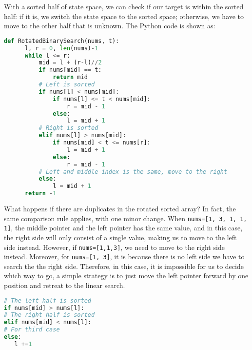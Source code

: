\documentclass[main.tex]{subfiles}
\begin{document}
With a sorted half of state space, we can check if our target is within the sorted half: if it is, we switch the state space to the sorted space; otherwise, we have to move to the other half that is unknown. The Python code is shown as:
\begin{lstlisting}[language=Python]
def RotatedBinarySearch(nums, t):   
      l, r = 0, len(nums)-1
      while l <= r:
          mid = l + (r-l)//2
          if nums[mid] == t:
              return mid
          # Left is sorted
          if nums[l] < nums[mid]: 
              if nums[l] <= t < nums[mid]:
                  r = mid - 1
              else:
                  l = mid + 1
          # Right is sorted
          elif nums[l] > nums[mid]: 
              if nums[mid] < t <= nums[r]:
                  l = mid + 1
              else:
                  r = mid - 1
          # Left and middle index is the same, move to the right
          else: 
              l = mid + 1
      return -1
\end{lstlisting}
\begin{bclogo}[couleur = blue!30, arrondi=0.1,logo=\bccrayon,ombre=true]{What happens if there are duplicates in the rotated sorted array? } In fact, the same comparison rule applies, with one minor change. When \texttt{nums=[1, 3, 1, 1, 1]}, the middle pointer and the left pointer has the same value, and in this case, the right side will only consist of a single value, making us to move to the left side instead. However, if \texttt{nums=[1,1,3]}, we need to move to the right side instead.  Moreover, for \texttt{nums=[1, 3]}, it is because there is no left side we have to search the the right side. Therefore, in this case, it is impossible for us to decide which way to go, a simple strategy is to just move the left pointer forward by one position and retreat to the linear search. 
\begin{lstlisting}[language=Python]
# The left half is sorted
if nums[mid] > nums[l]: 
# The right half is sorted
elif nums[mid] < nums[l]: 
# For third case
else: 
   l +=1 
\end{lstlisting}
\end{bclogo}




\end{document}
